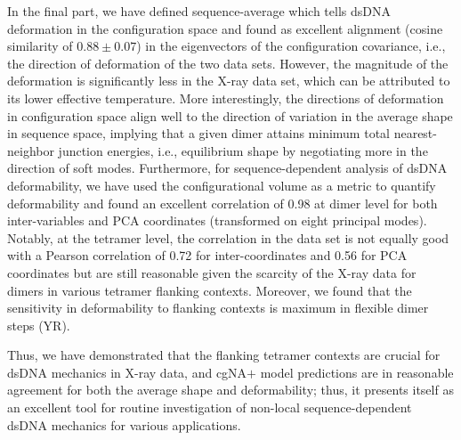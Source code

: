 In the final part, we have defined sequence-average  which tells dsDNA deformation in the configuration space and found as excellent alignment (cosine similarity of $0.88 \pm 0.07$) in the eigenvectors of the configuration covariance, i.e., the direction of deformation of the two data sets.
However, the magnitude of the deformation is significantly less in the X-ray data set, which can be attributed to its lower effective temperature.
More interestingly, the directions of deformation in configuration space align well to the direction of variation in the average shape in sequence space, implying that a given dimer attains minimum total nearest-neighbor junction energies, i.e., equilibrium shape by negotiating more in the direction of soft modes.
Furthermore, for sequence-dependent analysis of dsDNA deformability, we have used the configurational volume as a metric to quantify deformability and found an excellent correlation of 0.98 at dimer level for both inter-variables and PCA coordinates (transformed on eight principal modes).
Notably, at the tetramer level, the correlation in the data set is not equally good with a Pearson correlation of 0.72 for inter-coordinates and 0.56 for PCA coordinates but are still reasonable given the scarcity of the X-ray data for dimers in various tetramer flanking contexts. 
Moreover, we found that the sensitivity in deformability to flanking contexts is maximum in flexible dimer steps (YR).

Thus, we have demonstrated that the flanking tetramer contexts are crucial for dsDNA mechanics in X-ray data, and cgNA$+$ model predictions are in reasonable agreement for both the average shape and deformability; thus, it presents itself as an excellent tool for routine investigation of non-local sequence-dependent dsDNA mechanics for various applications.

